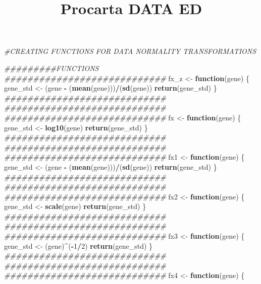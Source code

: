 \documentclass[]{article}
\title{Procarta DATA ED}
\author{}
\date{\vspace{-2.5em}}
\newenvironment{Shaded}{\begin{snugshade}}{\end{snugshade}}
\newcommand{\CommentTok}[1]{\textcolor[rgb]{0.56,0.35,0.01}{\textit{#1}}}
\newcommand{\ControlFlowTok}[1]{\textcolor[rgb]{0.13,0.29,0.53}{\textbf{#1}}}
\newcommand{\DecValTok}[1]{\textcolor[rgb]{0.00,0.00,0.81}{#1}}
\newcommand{\KeywordTok}[1]{\textcolor[rgb]{0.13,0.29,0.53}{\textbf{#1}}}
\newcommand{\NormalTok}[1]{#1}
\newcommand{\OperatorTok}[1]{\textcolor[rgb]{0.81,0.36,0.00}{\textbf{#1}}}
\newcommand{\StringTok}[1]{\textcolor[rgb]{0.31,0.60,0.02}{#1}}
\begin{document}
\maketitle

\begin{Shaded}
\begin{Highlighting}[]
\CommentTok{#CREATING FUNCTIONS FOR DATA NORMALITY TRANSFORMATIONS}

\CommentTok{#########FUNCTIONS}
\CommentTok{############################}
\NormalTok{fx_z <-}\StringTok{ }\ControlFlowTok{function}\NormalTok{(gene) \{}
\NormalTok{  gene_std <-}\StringTok{ }\NormalTok{(gene }\OperatorTok{-}\StringTok{ }\NormalTok{(}\KeywordTok{mean}\NormalTok{(gene)))}\OperatorTok{/}\NormalTok{(}\KeywordTok{sd}\NormalTok{(gene))}
  \KeywordTok{return}\NormalTok{(gene_std)}
\NormalTok{\}}
\CommentTok{############################}
\CommentTok{############################}
\CommentTok{############################}
\NormalTok{fx <-}\StringTok{ }\ControlFlowTok{function}\NormalTok{(gene) \{}
\NormalTok{  gene_std <-}\StringTok{ }\KeywordTok{log10}\NormalTok{(gene)}
  \KeywordTok{return}\NormalTok{(gene_std)}
\NormalTok{\}}
\CommentTok{############################}
\CommentTok{############################}
\CommentTok{############################}
\NormalTok{fx1 <-}\StringTok{ }\ControlFlowTok{function}\NormalTok{(gene) \{}
\NormalTok{  gene_std <-}\StringTok{ }\NormalTok{(gene }\OperatorTok{-}\StringTok{ }\NormalTok{(}\KeywordTok{mean}\NormalTok{(gene)))}\OperatorTok{/}\NormalTok{(}\KeywordTok{sd}\NormalTok{(gene))}
  \KeywordTok{return}\NormalTok{(gene_std)}
\NormalTok{\}}
\CommentTok{############################}
\CommentTok{############################}
\CommentTok{############################}
\NormalTok{fx2 <-}\StringTok{ }\ControlFlowTok{function}\NormalTok{(gene) \{}
\NormalTok{  gene_std <-}\StringTok{ }\KeywordTok{scale}\NormalTok{(gene)}
  \KeywordTok{return}\NormalTok{(gene_std)}
\NormalTok{\}}
\CommentTok{############################}
\CommentTok{############################}
\CommentTok{############################}
\NormalTok{fx3 <-}\StringTok{ }\ControlFlowTok{function}\NormalTok{(gene) \{}
\NormalTok{  gene_std <-}\StringTok{ }\NormalTok{(gene)}\OperatorTok{^}\NormalTok{(}\OperatorTok{-}\DecValTok{1}\OperatorTok{/}\DecValTok{2}\NormalTok{)}
  \KeywordTok{return}\NormalTok{(gene_std)}
\NormalTok{\}}
\CommentTok{############################}
\CommentTok{############################}
\CommentTok{############################}
\NormalTok{fx4 <-}\StringTok{ }\ControlFlowTok{function}\NormalTok{(gene) \{}

\end{Highlighting}
\end{Shaded}
\end{document}
